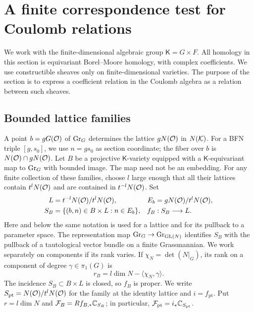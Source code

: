 \section{A finite correspondence test for Coulomb relations}
\label{sec:correspondences}

We work with the finite-dimensional algebraic group $\mathsf K=G\times F$.
All homology in this section is equivariant Borel--Moore homology, with
complex coefficients.  We use constructible sheaves only on finite-dimensional
varieties.  The purpose of the section is to express a coefficient relation
in the Coulomb algebra as a relation between such sheaves.

\subsection{Bounded lattice families}

A point $b=gG(\mathcal O)$ of $\operatorname{Gr}_G$ determines the lattice $gN(\mathcal O)$ in
$N(\mathcal K)$.  For a BFN triple $[g,s_0]$, we use $n=gs_0$ as section
coordinate; the fiber over $b$ is $N(\mathcal O)\cap gN(\mathcal O)$.
Let $B$ be a projective $\mathsf K$-variety equipped with a
$\mathsf K$-equivariant map to $\operatorname{Gr}_G$ with bounded image.  The map need not
be an embedding.  For any finite collection of these families, choose $l$
large enough that all their lattices contain $t^lN(\mathcal O)$ and are contained
in $t^{-l}N(\mathcal O)$.  Set
\begin{equation}
 \label{eq:finite-lattice-space}
 \begin{aligned}
 L&=t^{-l}N(\mathcal O)/t^lN(\mathcal O),&
 E_b&=gN(\mathcal O)/t^lN(\mathcal O),\\
 S_B&=\{(b,n)\in B\times L:n\in E_b\},&
 f_B&:S_B\longrightarrow L.
 \end{aligned}
\end{equation}
Here and below the same notation is used for a lattice and for its pullback
to a parameter space.  The representation map
$\operatorname{Gr}_G\to\operatorname{Gr}_{\operatorname{GL}(N)}$ identifies $S_B$ with the pullback of a
tautological vector bundle on a finite Grassmannian.  We work separately on
components if its rank varies.  If $\chi_N=\det(N|_G)$, its rank on a
component of degree $\gamma\in\pi_1(G)$ is
\begin{equation}
 \label{eq:lattice-rank}
 r_B=l\dim N-\langle\chi_N,\gamma\rangle.
\end{equation}
The incidence $S_B\subset B\times L$ is closed, so $f_B$ is proper.
We write $S_{\mathrm{pt}}=N(\mathcal O)/t^lN(\mathcal O)$ for the family at the
identity lattice and $i=f_{\mathrm{pt}}$.  Put $r=l\dim N$ and
$\mathcal F_B=Rf_{B,*}\mathbb C_{S_B}$; in particular,
$\mathcal F_{\mathrm{pt}}=i_*\mathbb C_{S_{\mathrm{pt}}}$.

